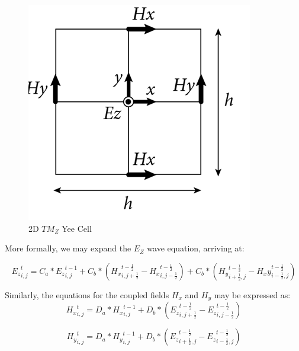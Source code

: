 \begin{figure}[H]
	\centering
	\includegraphics{yee-cell-ez.png}
	\caption{2D $TM_Z$ Yee Cell}
	\label{fig:yeecell}
\end{figure}

More formally, we may expand the $E_Z$ wave equation, arriving at:

\begin{equation} \label{eq:ezupdate}
{E_z}_{i,j}^{t} = C_a * {E_z}_{i,j}^{t-1} 
+ C_b * ({H_x}_{i,j+\frac{1}{2}}^{t-\frac{1}{2}} - {H_x}_{i,j-\frac{1}{2}}^{t-\frac{1}{2}})
+ C_b * ({H_y}_{i+\frac{1}{2},j}^{t-\frac{1}{2}} - {H_xy}_{i-\frac{1}{2},j}^{t-\frac{1}{2}})
\end{equation}

Similarly, the equations for the coupled fields $H_x$ and $H_y$ may be expressed as:
\begin{equation} \label{eq:hxupdate}
{H_x}_{i,j}^t = D_a * {H_x}_{i,j}^{t-1} + D_b * (
{E_z}_{i,j+\frac{1}{2}}^{t-\frac{1}{2}} 
-
{E_z}_{i,j-\frac{1}{2}}^{t-\frac{1}{2}}
)  
\end{equation}

\begin{equation} \label{eq:hyupdate}
{H_y}_{i,j}^t = D_a * {H_y}_{i,j}^{t-1} + D_b * (
{E_z}_{i+\frac{1}{2},j}^{t-\frac{1}{2}} 
-
{E_z}_{i-\frac{1}{2},j}^{t-\frac{1}{2}}
)  
\end{equation}













